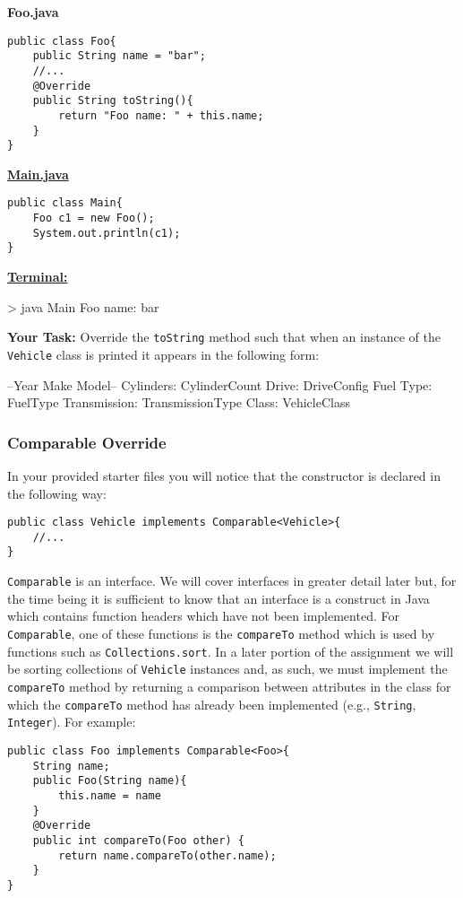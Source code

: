 \begin{framed}
\begin{minipage}{0.52\textwidth}
\textbf{Foo.java}
\begin{lstlisting}
public class Foo{
    public String name = "bar";
    //...
    @Override 
    public String toString(){
        return "Foo name: " + this.name;
    }
}
\end{lstlisting}
\end{minipage}
\hfill
\vline
\hfill
\begin{minipage}{0.42\textwidth}
\underline{\textbf{Main.java}}
\begin{lstlisting}
public class Main{
    Foo c1 = new Foo();
    System.out.println(c1);
}
\end{lstlisting}
\hline
\vspace{0.2cm}
\underline{\textbf{Terminal:}}
\begin{shell}
> java Main
Foo name: bar
\end{shell}
\end{minipage}
\end{framed}
\vspace{0.2cm}


\textbf{Your Task: } Override the \lstinline|toString| method such that when an instance of the \lstinline|Vehicle| class is printed it appears in the following form:
\begin{shell}
--Year Make Model--
Cylinders: CylinderCount
Drive: DriveConfig
Fuel Type: FuelType 
Transmission: TransmissionType
Class: VehicleClass

\end{shell}

\subsubsection{Comparable Override}

In your provided starter files you will notice that the constructor is declared in the following way:
\begin{lstlisting}[frame=trBL]
public class Vehicle implements Comparable<Vehicle>{
    //...
}
\end{lstlisting}
\lstinline|Comparable| is an interface. We will cover interfaces in greater
detail later but, for the time being it is sufficient to know that an interface
is a construct in Java which contains function headers which have not
been implemented. For \lstinline|Comparable|, one of these functions is the
\lstinline|compareTo| method which is used by functions such as
\lstinline|Collections.sort|. In a later portion of the assignment we will be
sorting collections of \lstinline|Vehicle| instances and, as such, we must
implement the \lstinline|compareTo| method by returning a comparison between
attributes in the class for which the \lstinline|compareTo| method has already
been implemented (e.g., \lstinline|String|, \lstinline|Integer|). For example:
\begin{lstlisting}[frame=trBL]
public class Foo implements Comparable<Foo>{
    String name;
    public Foo(String name){
        this.name = name
    }
    @Override
    public int compareTo(Foo other) {
        return name.compareTo(other.name);
    }
}
\end{lstlisting}


